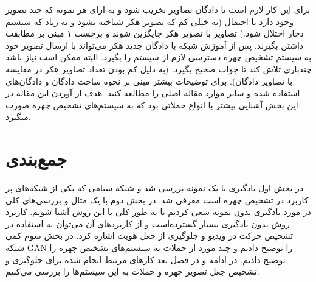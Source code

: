 برای این کار لازم است تا دادگان تصاویر تخریب شود و به ازای هر نمونه که چند تصویر وجود دارد با احتمال (نه خیلی کم که تصویر هکر شناخته نشود و نه زیاد که سیستم دچار اختلال شود.) تصاویر با تصویر هکر جایگزین شوند و برچسب ۱ مبنی بر مطابقت داشتن بگیرند. پس از آموزش شبکه با دادگان جدید هکر می‌تواند با ارسال تصویر خود به سیستم تشخیص چهره دسترسی لازم از سیستم را بگیرد. البته ممکن است نیاز باشد چندباری تلاش کند تا جواب صحیح بگیرد. (به دلیل کم بودن تعداد تصاویر هکر در مقایسه با تصاویر دادگان). برای توضیحات بیشتر مبنی بر نحوه ساخت دادگان و دادگان‌های استفاده شده و سایر موارد مقاله اصلی
\cite{Guo2021}
را مطالعه کنید. هدف از آوردن این مقاله در این بخش آشنایی بیشتر با انواع حملاتی بود که به سیستم‌های تشخیص چهره صورت میگیرد.

\section{جمع‌بندی}\label{sec:جمع‌بندی}
در بخش اول یادگیری با یک نمونه بررسی شد و شبکه سیامی که یکی از شبکه‌های پر کاربرد در تشخیص چهره است معرفی شد. در بخش دوم با یک مثال و بررسی‌های کلی در مورد یادگیری بدون نمونه سعی کردیم تا به طور کلی با این روش آشنا شویم. کاربرد روش بدون یادگیری بسیار گسترده‌است و از کاربرد‌های آن می‌توان به استفاده در تشخیص حرکت در ویدیو و جلوگیری از جعل هویت اشاره کرد. در بخش سوم کمی شبکه GAN را توضیح دادیم و چند مورد از حملات به سیستم‌های تشخیص چهره را توضیح دادیم. در ادامه و در فصل بعد کار‌های مرتبط انجام شده برای جلوگیری و تشخیص جعل تصویر چهره و حملات به این سیستم‌ها را بررسی می‌کنیم.
